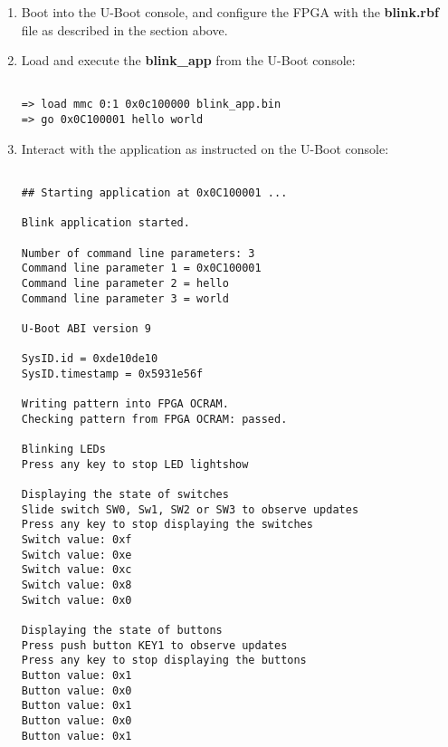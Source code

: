 \begin{flushleft}
\begin{enumerate}[
	label=\textbf{Step \arabic*.},
	leftmargin=*,
	widest={00},
	align=left]
\begin{verbatim}

+\$+ cd +\$+DE10_NANO
+\$+ mkdir sdcard
+\$+ sudo mount +\textcolor{red}{/dev/sdx}+1 sdcard
+\$+ sudo cp +\$+DE10_NANO/uboot-socfpga/git/examples/standalone/blink_app.bin sdcard/
+\$+ sudo umount +\textcolor{red}{/dev/sdx}+1
+\$+ sudo sync

\end{verbatim}

\item Boot into the U-Boot console, and configure the FPGA with the \textbf{blink.rbf} file as described in the  section above.

\item Load and execute the \textbf{blink\_app} from the U-Boot console:

\begin{verbatim}

=> load mmc 0:1 0x0c100000 blink_app.bin
=> go 0x0C100001 hello world

\end{verbatim}

\item Interact with the application as instructed on the U-Boot console:

\begin{verbatim}

## Starting application at 0x0C100001 ...

Blink application started.

Number of command line parameters: 3
Command line parameter 1 = 0x0C100001
Command line parameter 2 = hello
Command line parameter 3 = world

U-Boot ABI version 9

SysID.id = 0xde10de10
SysID.timestamp = 0x5931e56f

Writing pattern into FPGA OCRAM.
Checking pattern from FPGA OCRAM: passed.

Blinking LEDs
Press any key to stop LED lightshow

Displaying the state of switches
Slide switch SW0, Sw1, SW2 or SW3 to observe updates
Press any key to stop displaying the switches
Switch value: 0xf
Switch value: 0xe
Switch value: 0xc
Switch value: 0x8
Switch value: 0x0

Displaying the state of buttons
Press push button KEY1 to observe updates
Press any key to stop displaying the buttons
Button value: 0x1
Button value: 0x0
Button value: 0x1
Button value: 0x0
Button value: 0x1


\end{verbatim}
\end{enumerate}
\end{flushleft}
